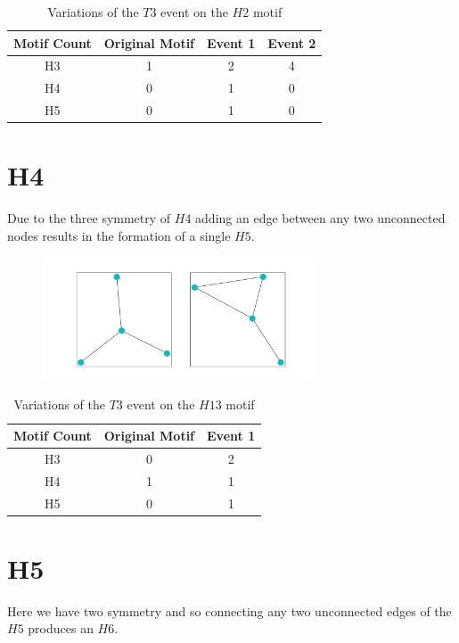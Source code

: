 \begin{table}
    \centering
    \begin{tabular}{||c c c c||} 
    \hline
    Motif Count & Original Motif & Event 1 & Event 2\\ [0.5ex] 
    \hline\hline
    H3 & 1 & 2 & 4\\ 
    \hline
    H4 & 0& 1 & 0  \\
    \hline
    H5 & 0& 1 & 0  \\
    \hline
   \end{tabular}
   \caption{Variations of the $T3$ event on the $H2$ motif}
   \label{table:12}
\end{table}

\section{H4}
Due to the three symmetry of $H4$ adding an edge between any two unconnected nodes results in 
the formation of a single $H5$.

\begin{figure}[!ht]
    \includegraphics[width=8cm]{Images/H4_T3_evolution.png}
    \centering
\end{figure}

\begin{table}
    \centering
    \begin{tabular}{||c c c||} 
    \hline
    Motif Count & Original Motif & Event 1 \\ [0.5ex] 
    \hline
    H3 & 0 & 2 \\ 
    \hline
    H4 & 1 & 1 \\
    \hline
    H5 & 0 & 1 \\
    \hline
   \end{tabular}
   \caption{Variations of the $T3$ event on the $H13$ motif}
   \label{table:13}
\end{table}

\section{H5}
Here we have two symmetry and so connecting any two unconnected edges of the $H5$ produces an $H6$.

